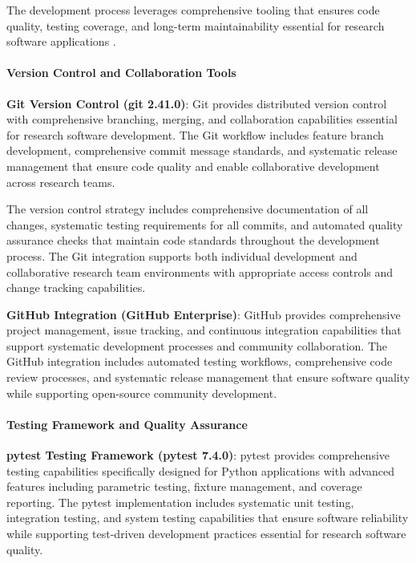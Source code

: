 \documentclass[11pt,a4paper]{report}
\begin{document}
The development process leverages comprehensive tooling that ensures code quality, testing coverage, and long-term
maintainability essential for research software applications .

\paragraph{Version Control and Collaboration Tools}

\textbf{Git Version Control (git 2.41.0)}: Git provides distributed version control with comprehensive branching, merging,
and collaboration capabilities essential for research software development. The Git workflow includes feature branch
development, comprehensive commit message standards, and systematic release management that ensure code quality and
enable collaborative development across research teams.

The version control strategy includes comprehensive documentation of all changes, systematic testing requirements for
all commits, and automated quality assurance checks that maintain code standards throughout the development process. The
Git integration supports both individual development and collaborative research team environments with appropriate
access controls and change tracking capabilities.

\textbf{GitHub Integration (GitHub Enterprise)}: GitHub provides comprehensive project management, issue tracking, and
continuous integration capabilities that support systematic development processes and community collaboration. The
GitHub integration includes automated testing workflows, comprehensive code review processes, and systematic release
management that ensure software quality while supporting open-source community development.

\paragraph{Testing Framework and Quality Assurance}

\textbf{pytest Testing Framework (pytest 7.4.0)}: pytest provides comprehensive testing capabilities specifically designed
for Python applications with advanced features including parametric testing, fixture management, and coverage reporting.
The pytest implementation includes systematic unit testing, integration testing, and system testing capabilities that
ensure software reliability while supporting test-driven development practices essential for research software quality.
\end{document}

